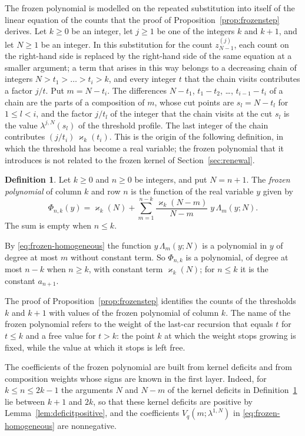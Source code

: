 \documentclass{amsart}
\theoremstyle{definition}
\newtheorem{definition}[theorem]{Definition}
\theoremstyle{remark}
\numberwithin{equation}{section}
\begin{document}
The frozen polynomial is modelled on the repeated substitution into itself
of the linear equation of the counts that the proof of
Proposition~\ref{prop:frozenstep} derives. Let $k\ge0$ be an integer, let
$j\ge1$ be one of the integers $k$ and $k+1$, and let $N\ge1$ be an
integer. In this substitution for the count $z^{(j)}_{N-1}$, each count on
the right-hand side is replaced by the right-hand side of the same equation
at a smaller argument; a term that arises in this way belongs to a
decreasing chain of integers $N>t_1>\dots>t_i>k$, and every integer $t$
that the chain visits contributes a factor $j/t$.
Put $m=N-t_i$. The differences $N-t_1$, $t_1-t_2$, \dots, $t_{i-1}-t_i$ of
a chain are the parts of a composition of $m$, whose cut points are
$s_l=N-t_l$ for $1\le l<i$, and the factor $j/t_l$ of the integer that the
chain visits at the cut $s_l$ is the value $\lambda^{j,N}(s_l)$ of the
threshold profile. The last integer of the chain contributes
$(j/t_i)\,\varkappa_k(t_i)$. This is the origin of the following
definition, in which the threshold has become a real variable; the frozen
polynomial that it introduces is not related to the frozen kernel of
Section~\ref{sec:renewal}.

\begin{definition}\label{def:frozenpolynomial}
Let $k\ge0$ and $n\ge0$ be integers, and put $N=n+1$. The \emph{frozen
polynomial} of column $k$ and row $n$
is the function of the real variable $y$ given by
\[
\Phi_{n,k}(y)=\varkappa_k(N)+\sum_{m=1}^{n-k}\frac{\varkappa_k(N-m)}{N-m}\;y\,\Lambda_m(y;N).
\]
The sum is empty when $n\le k$.
\end{definition}

By \eqref{eq:frozen-homogeneous} the function $y\,\Lambda_m(y;N)$ is a
polynomial in $y$ of degree at most $m$ without constant term. So
$\Phi_{n,k}$ is a polynomial, of degree at most $n-k$ when $n\ge k$, with
constant term $\varkappa_k(N)$; for $n\le k$ it is the constant
$a_{n+1}$.

The proof of Proposition~\ref{prop:frozenstep} identifies the counts of the
thresholds $k$ and $k+1$ with values of the frozen polynomial of column
$k$. The name of the frozen polynomial refers to the weight of the last-car
recursion that equals $t$ for $t\le k$ and a free value for $t>k$: the point
$k$ at which the weight stops growing is fixed, while the value at which it
stops is left free.

The coefficients of the frozen polynomial are built from kernel deficits
and from composition weights whose signs are known in the first layer.
Indeed, for
$k\le n\le 2k-1$ the arguments $N$ and $N-m$ of the kernel deficits in
Definition~\ref{def:frozenpolynomial} lie between $k+1$ and $2k$, so that
these kernel deficits are positive by Lemma~\ref{lem:deficitpositive}, and
the coefficients $V_q(m;\lambda^{1,N})$ in \eqref{eq:frozen-homogeneous} are
nonnegative.
\end{document}
